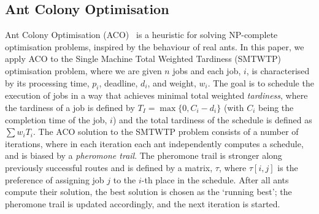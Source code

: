 \documentclass[smallextended]{svjour3}
\begin{document}



\subsection{Ant Colony Optimisation}
\label{sec:aco}
\noindent
Ant Colony Optimisation (ACO)~\cite{aco} is a heuristic for solving NP-complete
optimisation problems, inspired by the behaviour of real ants. In this paper, we apply ACO to the 
Single Machine Total Weighted Tardiness (SMTWTP) optimisation
problem, where we are given $n$ jobs
and each job, $i$, is characterised by its processing time, $p_i$,
deadline, $d_i$,  and weight, $w_i$. The goal is to schedule the execution
of jobs in a way that achieves minimal total weighted
\emph{tardiness}, where the tardiness of a
job is defined by $T_I = \max \{0, C_i-d_i \}$ (with $C_i$ being the
completion time of the job, $i$) and the total tardiness
of the schedule is defined as $\sum w_i T_i$.
The ACO solution to the SMTWTP problem consists of a number of
iterations, where in each iteration each ant
independently computes a schedule, and is biased by
a \emph{pheromone trail}. The pheromone trail is stronger along previously successful routes and is defined 
by a matrix, $\tau$, where $\tau[i,j]$ is the preference of assigning 
job $j$ to the $i$-th place in the schedule. 
After all ants compute their solution, the best solution is chosen as
the `running best'; the pheromone trail is updated accordingly, and the next iteration is started.
\end{document}

